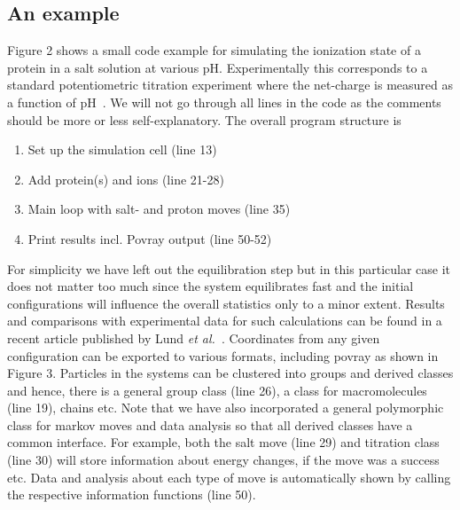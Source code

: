 \documentclass[10pt]{bmc_article}
\newenvironment{bmcformat}{\fussy\setboolean{publ}{true}}{\fussy}
\begin{document}
\begin{bmcformat}



\subsection*{An example}
Figure 2 shows a small code example for simulating the ionization state of a protein in a salt solution at various pH. Experimentally this corresponds to a standard potentiometric titration experiment where the net-charge is measured as a function of pH~\cite{tanford:72}. We will not go through all lines in the code as the comments should be more or less self-explanatory. The overall program structure is
\begin{enumerate}
\item Set up the simulation cell (line 13)
\item Add protein(s) and ions (line 21-28)
\item Main loop with salt- and proton moves (line 35)
\item Print results incl. Povray output (line 50-52)
\end{enumerate}
For simplicity we have left out the equilibration step but in this particular case it does not matter too much since the system equilibrates fast and the initial configurations will influence the overall statistics only to a minor extent.
Results and comparisons with experimental data for such calculations can be found in a recent article published by Lund \emph{et al.}~\cite{lund:07}.
Coordinates from any given configuration can be exported to various formats, including povray as shown in Figure 3.
Particles in the systems can be clustered into groups and derived classes and hence, there is a general group class (line 26), a class for macromolecules (line 19), chains etc. Note that we have also incorporated a general polymorphic class for markov moves and data analysis so that all derived classes have a common interface. For example, both the salt move (line 29) and titration class (line 30) will store information about energy changes, if the move was a success etc. Data and analysis about each type of move is automatically shown by calling the respective information functions (line 50).


\end{bmcformat}
\end{document}
